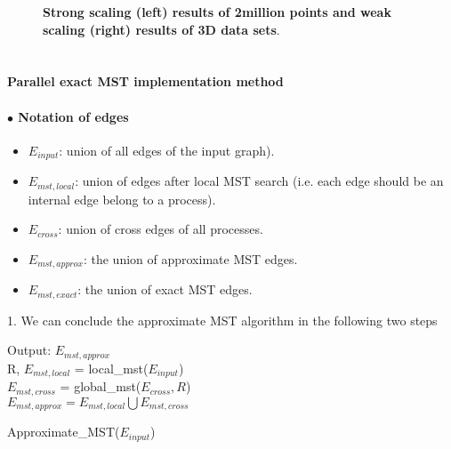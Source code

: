 \documentclass[12pt]{article}
\begin{document}
\begin{appendices}
\begin{figure}[h]
	\caption{\textbf{Strong scaling (left) results of 2million points and weak scaling (right) results of 3D data sets}.}
	\label{3D_nopar}
\end{figure}

\clearpage
\section{}
\paragraph{\large{Parallel exact MST implementation method}}
\paragraph{$\bullet$ Notation of edges}
    \begin{itemize}
        \item $E_{input}$: union of all edges of the input graph).
        \item $E_{mst,local}$: union of edges after local MST search (i.e. each edge should be an internal edge belong to a process).
        \item $E_{cross}$: union of cross edges of all processes.
        \item $E_{mst,approx}$: the union of approximate MST edges.
        \item $E_{mst,exact}$: the union of exact MST edges.
    \end{itemize}


1. We can conclude the approximate MST algorithm in the following two steps
\begin{algorithm}[!h]
	\DontPrintSemicolon
    Output: $E_{mst,approx}$  \\
        \nl R, $E_{mst,local}$ = local\_mst($E_{input}$)\\
        \nl  $E_{mst,cross}$ = global\_mst($E_{cross}, R$)\\
        \nl $E_{mst,approx} = E_{mst,local} \bigcup E_{mst,cross}$
	\caption{Approximate\_MST($E_{input}$)}
	\label{approxmst}
\end{algorithm}



\end{appendices}
\end{document}
